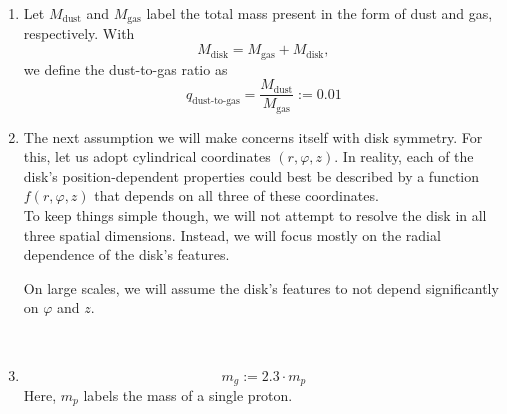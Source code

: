\begin{enumerate}
        \item {}
            Let $M_\text{dust}$ and $M_\text{gas}$ label the total mass present in the form of dust 
            and gas, respectively. 
            With
            \begin{equation}
                M_\text{disk} = M_\text{gas} + M_\text{disk},
            \end{equation}
            we define the dust-to-gas ratio as
            \begin{equation}
                q_\text{dust-to-gas}=\frac{M_\text{dust}}{M_\text{gas}}:=0.01
            \end{equation}
    
        \item The next assumption we will make concerns itself with disk symmetry. For this, let us 
            adopt cylindrical coordinates $(r, \varphi, z)$. In reality, each of the disk's 
            position-dependent properties could best be described by a function $f(r, \varphi, z)$ 
            that depends on all three of these coordinates. \\
            To keep things simple though, we will not attempt to resolve the disk in all three 
            spatial dimensions. Instead, we will focus mostly on the radial dependence of the 
            disk's features.
    
            On large scales, we will assume the disk's features to not depend significantly on 
            $\varphi$ and $z$.
    
             \\

    
        \item {}
            \begin{equation}
                m_g
                    := 2.3 \cdot m_p
            \end{equation}
            Here, $m_p$ labels the mass of a single proton. \\
    

\end{enumerate}
